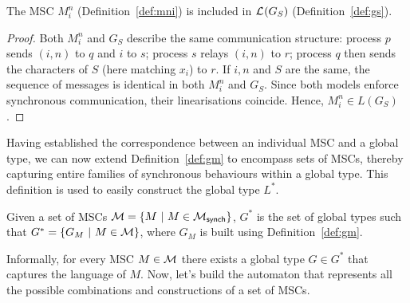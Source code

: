 \bigskip

\begin{lemma}\label{lmm:msgs}
The MSC $M^n_i$ (Definition~\ref{def:mni}) is included in 
$\mathcal{L}_{}^{}(G_S)$ (Definition~\ref{def:gs}).
\end{lemma}

\begin{proof}
	Both $M^n_i$ and $G_S$ describe the same communication structure:
	process $p$ sends $(i,n)$ to $q$ and $i$ to $s$;
	process $s$ relays $(i,n)$ to $r$;
	process $q$ then sends the characters of $S$ (here matching $x_i$) to $r$.
	If $i,n$ and $S$ are the same, the sequence of messages is identical in both 
	$M^n_i$ and $G_S$. Since both models enforce synchronous communication, 
	their linearisations coincide. Hence, $M^n_i \in L(G_S)$.
\end{proof}

Having established the correspondence between an individual MSC and a  
global type, we can now extend Definition~\ref{def:gm} to encompass  
sets of MSCs, thereby capturing entire families of synchronous  
behaviours within a global type. This definition is used to easily 
construct the global type $L^*$.

\bigskip

\begin{definition}[$G^*$]\label{def:gstar}
	Given a set of MSCs $\mathcal{M} =\{M\ |\ M\in\mscsetofmodel{\synchmodel}\}$,
	$G^*$ is the set of global types such that $G^*=\{G_M\ |\ M \in \mathcal{M}\}$,
	where $G_M$ is built using Definition~\ref{def:gm}.
\end{definition}

Informally, for every MSC $M\in\mathcal{M}$ there exists a global type $G\in G^*$ that
captures the language of $M$. Now, let's build the automaton that represents
all the possible combinations and constructions of a set of MSCs.

\bigskip

